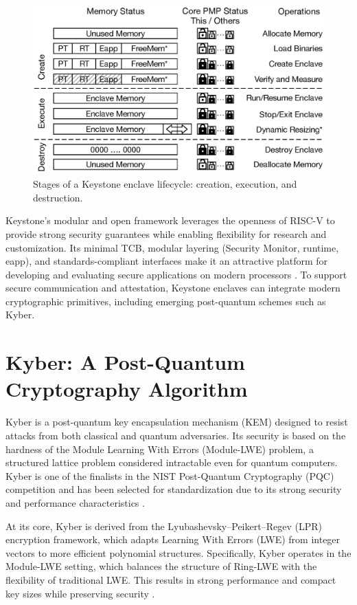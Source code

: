 \begin{figure}[htbp]
\centering
\includegraphics[width=0.9\linewidth]{figures/enclave_lifecycle.png}
\caption{Stages of a Keystone enclave lifecycle: creation, execution, and destruction.}
\label{fig:enclave_lifecycle}
\end{figure}

Keystone’s modular and open framework leverages the openness of RISC-V to provide strong security guarantees while enabling flexibility for research and customization. Its minimal TCB, modular layering (Security Monitor, runtime, eapp), and standards-compliant interfaces make it an attractive platform for developing and evaluating secure applications on modern processors \cite{dayeol2019keystone}. 
To support secure communication and attestation, Keystone enclaves can integrate modern cryptographic primitives, including emerging post-quantum schemes such as Kyber.

\section{Kyber: A Post-Quantum Cryptography Algorithm}
\label{sec:kyber}

Kyber is a post-quantum key encapsulation mechanism (KEM) designed to resist attacks from both classical and quantum adversaries. Its security is based on the hardness of the Module Learning With Errors (Module-LWE) problem, a structured lattice problem considered intractable even for quantum computers. Kyber is one of the finalists in the NIST Post-Quantum Cryptography (PQC) competition and has been selected for standardization due to its strong security and performance characteristics \cite{kyber2024}.  %

At its core, Kyber is derived from the Lyubashevsky–Peikert–Regev (LPR) encryption framework, which adapts Learning With Errors (LWE) from integer vectors to more efficient polynomial structures. Specifically, Kyber operates in the Module-LWE setting, which balances the structure of Ring-LWE with the flexibility of traditional LWE. This results in strong performance and compact key sizes while preserving security \cite{kyber2024,kyber2021}. %

